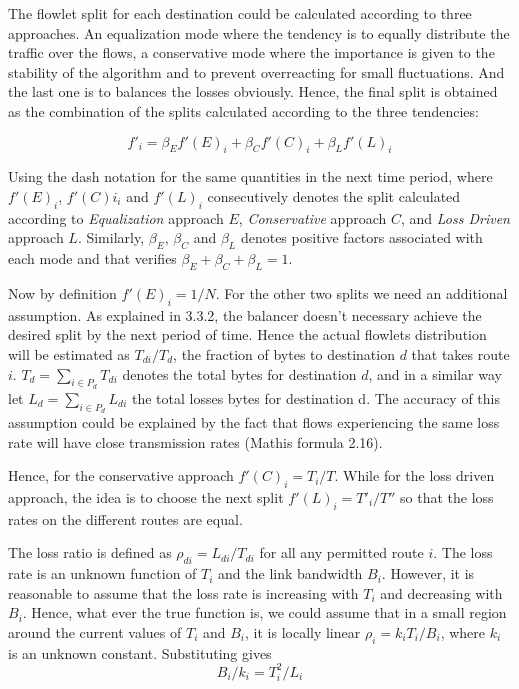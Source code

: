 The flowlet split for each destination could be calculated according to three approaches. An equalization mode where the tendency is to equally distribute the traffic over the flows, a conservative mode where the importance is given to the stability of the algorithm and to prevent overreacting for small fluctuations. And the last one is to balances the losses obviously.
Hence, the final split is obtained as the combination of the splits calculated according to the three tendencies:

\begin{equation}
f'_{i} = \beta_{E}f'(E)_{i} + \beta_{C}f'(C)_{i} + \beta_{L}f'(L)_{i}
\end{equation}

Using the dash notation for the same quantities in the next time period, where $f'(E)_{i}$, $f'(C)i_{i}$ and $f'(L)_{i}$ consecutively denotes the split calculated according to {\it Equalization} approach $E$, {\it Conservative} approach $C$, and {\it Loss Driven } approach $L$. Similarly, $\beta_{E}$, $\beta_{C}$ and $\beta_{L}$ denotes positive factors associated with each mode and that verifies $\beta_{E}+\beta_{C}+\beta_{L} = 1$. 

Now by definition $f'(E)_{i} = 1/N$. For the other two splits we need an additional assumption. As explained in 3.3.2,  the balancer doesn't necessary achieve the desired split by the next period of time. Hence the actual flowlets distribution will be estimated as $T_{di}/ T_{d}$, the fraction of bytes to destination $d$ that takes route $i$. $T_{d} = \sum_{i \in P_{d}}T_{di}$ denotes the total bytes for destination $d$,  and in a similar way let $L_{d} = \sum_{i \in P_{d}}L_{di}$ the total losses bytes for destination d. The accuracy of this assumption could be explained by the fact that flows experiencing the same loss rate will have close transmission rates (Mathis formula 2.16).

Hence, for the conservative approach $f'(C)_{i} = T_{i}/T$. While for the loss driven approach, the idea is to choose the next split  $f'(L)_{i} = T'_{i}/T''$ so that the loss rates on the different routes are equal.

The loss ratio is defined as $\rho_{di} = L_{di}/T_{di}$ for all any permitted route $i$. The loss rate is an unknown function of $T_{i}$ and the link bandwidth $B_{i}$. However, it is reasonable to assume that the loss rate is increasing with $T_{i}$ and decreasing with $B_{i}$. Hence, what ever the true function is, we could assume that in a small region around the current values of $T_{i}$ and $B_{i}$, it is locally linear $\rho_{i} = k_{i}T_{i}/B_{i}$, where $k_{i}$ is an unknown constant. Substituting gives
\begin{equation}
B_{i}/k_{i} = T_{i}^{2}/L_{i}
\end{equation}

